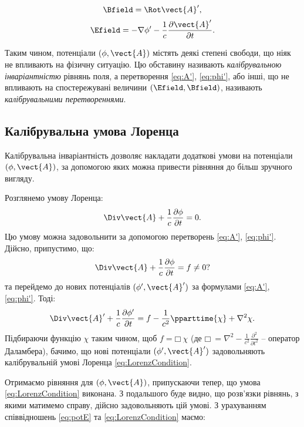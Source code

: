 \begin{equation}
	\Bfield = \Rot \vect{A}',
\end{equation}
\begin{equation}
	\Efield = -\nabla \phi' - \frac{1}{c} \frac{\partial \vect{A}'}{\partial t}.
\end{equation}

Таким чином, потенціали $(\phi, \vect{A})$ містять деякі степені свободи, що ніяк не
впливають на фізичну ситуацію. Цю обставину називають \emph{калібрувальною
інваріантністю} рівнянь поля, а перетворення \eqref{eq:A'}, \eqref{eq:phi'}, або інші, що не
впливають на спостережувані величини $(\Efield, \Bfield)$, називають \emph{калібрувальними
перетвореннями}.


\subsection*{Калібрувальна умова Лоренца}

Калібрувальна інваріантність дозволяє накладати додаткові умови на
потенціали $(\phi, \vect{A})$, за допомогою яких можна привести рівняння до більш
зручного вигляду.

Розглянемо умову Лоренца:
\begin{equation}\label{eq:LorenzCondition}
	\Div \vect{A} + \frac{1}{c} \frac{\partial \phi}{\partial t} = 0.
\end{equation}
Цю умову можна задовольнити за допомогою перетворень \eqref{eq:A'}, \eqref{eq:phi'}.
Дійсно, припустимо, що:
\begin{equation*}
	\Div \vect{A} + \frac{1}{c} \frac{\partial \phi}{\partial t} = f \neq 0?
\end{equation*}
та перейдемо до нових потенціалів $(\phi', \vect{A}')$ за формулами \eqref{eq:A'}, \eqref{eq:phi'}. Тоді:
\begin{equation*}
    \Div \vect{A}' + \frac{1}{c} \frac{\partial \phi'}{\partial t} =
	f - \frac{1}{c^2} \pparttime{\chi} + \nabla^2\chi.
\end{equation*}
Підбираючи функцію $\chi$ таким чином, щоб $f = \mdlgwhtsquare\  \chi$
(де $\mdlgwhtsquare\  = \nabla^2 - \frac{1}{c^2} \frac{\partial^2}{\partial t^2}$ – оператор Даламбера), бачимо, що нові потенціали $(\phi',
	\vect{A}')$
задовольняють калібрувальній умові Лоренца \eqref{eq:LorenzCondition}.

Отримаємо рівняння для $(\phi, \vect{A})$, припускаючи тепер, що умова \eqref{eq:LorenzCondition}
виконана. З подальшого буде видно, що розв’язки рівнянь, з якими
матимемо справу, дійсно задовольняють цій умові. З урахуванням
співвідношень \eqref{eq:potE} та \eqref{eq:LorenzCondition} маємо:

